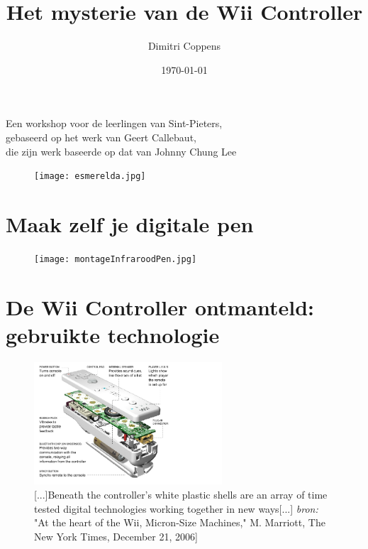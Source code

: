 \documentclass[11pt]{article}
\title{\textbf{Het mysterie van de Wii Controller}}
\author {Dimitri Coppens}
\date{\today}
\begin{document}
\maketitle

\begin{flushright}Een workshop voor de leerlingen van Sint-Pieters,\\
gebaseerd op het werk van Geert Callebaut,\\
die zijn werk baseerde op dat van Johnny Chung Lee	
\end{flushright}

\begin{figure}[h]
\begin{center}
\texttt{[image: esmerelda.jpg]}
\end{center}
\end{figure}

\newpage

\section{Maak zelf je digitale pen}
\vspace{3cm}
\begin{figure}[h]
\begin{center}
\texttt{[image: montageInfraroodPen.jpg]}
\end{center}
\end{figure}

\newpage
\section{De Wii Controller ontmanteld: gebruikte technologie}

\begin{figure}[h] \begin{center}
\includegraphics[width=7cm]{newYorkTimesWiiController01.jpg}
\caption{[...]Beneath the controller's white plastic shells are an array of time tested digital technologies working together in new ways[...] \textit{bron:} "At the heart of the Wii, Micron-Size Machines," M. Marriott, The New York Times, December 21, 2006]}
\end{center} \end{figure}
\end{document}
